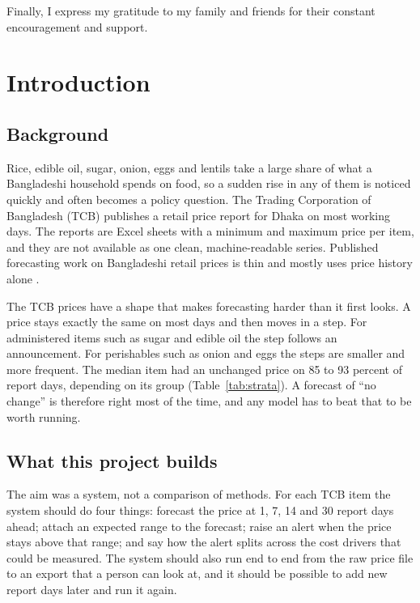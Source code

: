 \documentclass[12pt]{report}
\begin{document}
\noindent Finally, I express my gratitude to my family and friends for their constant encouragement and support.

\newpage
\renewcommand*\contentsname{Table of Contents}
\tableofcontents

\listoffigures
\listoftables
{}

\chapter{Introduction}

\justifying

\section{Background}
Rice, edible oil, sugar, onion, eggs and lentils take a large share of what a Bangladeshi household spends on food, so a sudden rise in any of them is noticed quickly and often becomes a policy question. The Trading Corporation of Bangladesh (TCB) publishes a retail price report for Dhaka on most working days. The reports are Excel sheets with a minimum and maximum price per item, and they are not available as one clean, machine-readable series. Published forecasting work on Bangladeshi retail prices is thin and mostly uses price history alone \cite{agripricebd}.

The TCB prices have a shape that makes forecasting harder than it first looks. A price stays exactly the same on most days and then moves in a step. For administered items such as sugar and edible oil the step follows an announcement. For perishables such as onion and eggs the steps are smaller and more frequent. The median item had an unchanged price on 85 to 93 percent of report days, depending on its group (Table~\ref{tab:strata}). A forecast of ``no change'' is therefore right most of the time, and any model has to beat that to be worth running.

\section{What this project builds}
The aim was a system, not a comparison of methods. For each TCB item the system should do four things: forecast the price at 1, 7, 14 and 30 report days ahead; attach an expected range to the forecast; raise an alert when the price stays above that range; and say how the alert splits across the cost drivers that could be measured. The system should also run end to end from the raw price file to an export that a person can look at, and it should be possible to add new report days later and run it again.
\end{document}
